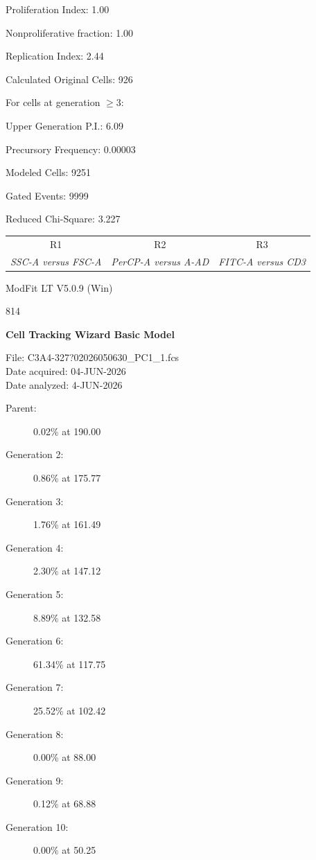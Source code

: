 \documentclass[UTF8,10pt,a4paper,fontset=fandol]{ctexart}
\newcommand{\handwritten}[1]{#1}
\begin{document}
\noindent
Proliferation Index: 1.00\par
Nonproliferative fraction: 1.00\par
Replication Index: 2.44\par
Calculated Original Cells: 926

\noindent
For cells at generation $\geq 3$:\par
Upper Generation P.I.: 6.09\par
Precursory Frequency: 0.00003

\noindent
Modeled Cells: 9251\par
Gated Events: 9999\par
Reduced Chi-Square: 3.227

\begin{center}
\begin{tabular}{ccc}
R1 & R2 & R3\\
\textit{SSC-A versus FSC-A} &
\textit{PerCP-A versus A-AD} &
\textit{FITC-A versus CD3}\\
\end{tabular}
\end{center}

\noindent
ModFit LT V5.0.9 (Win)

\handwritten{814}

\newpage

\begin{figure}[ht]
\centering
{}
\end{figure}

\noindent
\textbf{Cell Tracking Wizard Basic Model}

\noindent
File: C3A4-327?02026050630\_PC1\_1.fcs\\
Date acquired: 04-JUN-2026\\
Date analyzed: 4-JUN-2026

\begin{description}
\item[Parent:] 0.02\% at 190.00
\item[Generation 2:] 0.86\% at 175.77
\item[Generation 3:] 1.76\% at 161.49
\item[Generation 4:] 2.30\% at 147.12
\item[Generation 5:] 8.89\% at 132.58
\item[Generation 6:] 61.34\% at 117.75
\item[Generation 7:] 25.52\% at 102.42
\item[Generation 8:] 0.00\% at 88.00
\item[Generation 9:] 0.12\% at 68.88
\item[Generation 10:] 0.00\% at 50.25
\end{description}
\end{document}
